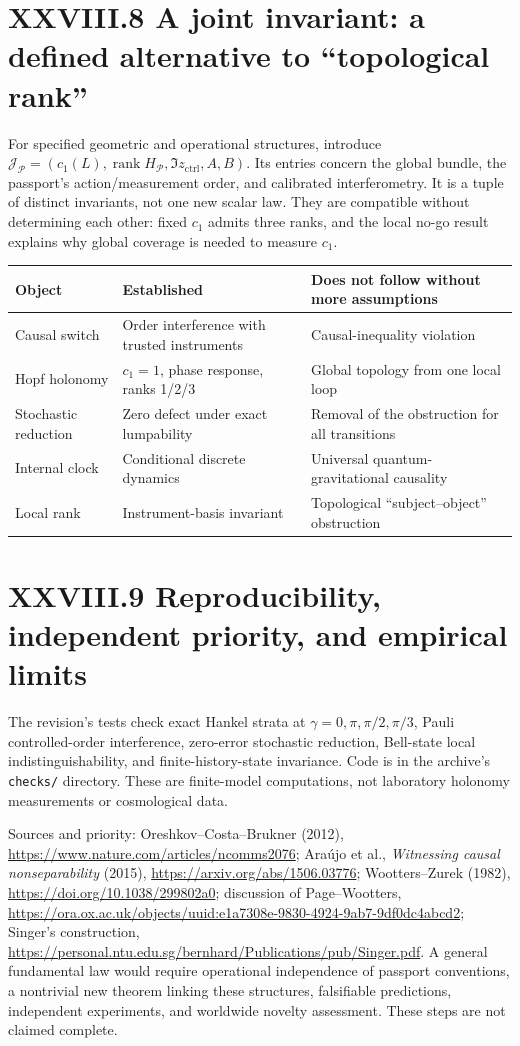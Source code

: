 \documentclass[11pt,a4paper,oneside]{book}
\DeclareMathOperator{\rank}{rank}\DeclareMathOperator{\Tr}{Tr}
\begin{document}
\section*{XXVIII.8 A joint invariant: a defined alternative to ``topological rank''}
For specified geometric and operational structures, introduce $\mathcal J_{\mathcal P}=(c_1(L),\rank H_{\mathcal P},\Im z_{\mathrm{ctrl}},A,B)$. Its entries concern the global bundle, the passport's action/measurement order, and calibrated interferometry. It is a tuple of distinct invariants, not one new scalar law. They are compatible without determining each other: fixed $c_1$ admits three ranks, and the local no-go result explains why global coverage is needed to measure $c_1$.
\begin{center}\small\begin{tabularx}{\textwidth}{@{}p{}XX@{}}\toprule
Object&Established&Does not follow without more assumptions\\\midrule
Causal switch&Order interference with trusted instruments&Causal-inequality violation\\
Hopf holonomy&$c_1=1$, phase response, ranks 1/2/3&Global topology from one local loop\\
Stochastic reduction&Zero defect under exact lumpability&Removal of the obstruction for all transitions\\
Internal clock&Conditional discrete dynamics&Universal quantum-gravitational causality\\
Local rank&Instrument-basis invariant&Topological ``subject--object'' obstruction\\\bottomrule
\end{tabularx}\end{center}
\section*{XXVIII.9 Reproducibility, independent priority, and empirical limits}
The revision's tests check exact Hankel strata at $\gamma=0,\pi,\pi/2,\pi/3$, Pauli controlled-order interference, zero-error stochastic reduction, Bell-state local indistinguishability, and finite-history-state invariance. Code is in the archive's \texttt{checks/} directory. These are finite-model computations, not laboratory holonomy measurements or cosmological data.

Sources and priority: Oreshkov--Costa--Brukner (2012), \url{https://www.nature.com/articles/ncomms2076}; Ara\'ujo et al., \textit{Witnessing causal nonseparability} (2015), \url{https://arxiv.org/abs/1506.03776}; Wootters--Zurek (1982), \url{https://doi.org/10.1038/299802a0}; discussion of Page--Wootters, \url{https://ora.ox.ac.uk/objects/uuid:e1a7308e-9830-4924-9ab7-9df0dc4abcd2}; Singer's construction, \url{https://personal.ntu.edu.sg/bernhard/Publications/pub/Singer.pdf}. A general fundamental law would require operational independence of passport conventions, a nontrivial new theorem linking these structures, falsifiable predictions, independent experiments, and worldwide novelty assessment. These steps are not claimed complete.
\end{document}
